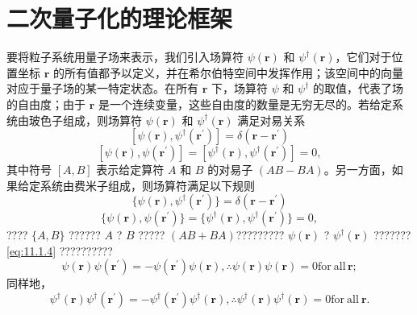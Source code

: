 \section{二次量子化的理论框架}\label{ux4e8cux6b21ux91cfux5b50ux5316ux7684ux7406ux8bbaux6846ux67b6}
要将粒子系统用量子场来表示，我们引入场算符 \(\psi(\boldsymbol{r})\) 和 \(\psi^{\dagger}(\boldsymbol{r})\)，它们对于位置坐标 \(\boldsymbol{r}\) 的所有值都予以定义，并在希尔伯特空间中发挥作用；该空间中的向量对应于量子场的某一特定状态。在所有 \(\boldsymbol{r}\) 下，场算符 \(\psi\) 和 \(\psi^{\dagger}\) 的取值，代表了场的自由度；由于 \(\boldsymbol{r}\) 是一个连续变量，这些自由度的数量是无穷无尽的。若给定系统由玻色子组成，则场算符 \(\psi(\boldsymbol{r})\) 和 \(\psi^{\dagger}(\boldsymbol{r})\) 满足对易关系
\begin{equation}\tag{11.1.1}\label{eq:11.1.1}
[ \psi ( \boldsymbol { r } ) , \psi ^{\dagger} ( \boldsymbol { r } ^{\prime} ) ] = \delta ( \boldsymbol { r } - \boldsymbol { r } ^{\prime} )
\end{equation}
\begin{equation}\tag{11.1.2}\label{eq:11.1.2}
[ \psi ( \pmb { r } ) , \psi ( \pmb { r } ^{\prime} ) ] = [ \psi ^{\dagger} ( \pmb { r } ) , \psi ^{\dagger} ( \pmb { r } ^{\prime} ) ] = 0 ,
\end{equation}
其中符号 \([A,B]\) 表示给定算符 \(A\) 和 \(B\) 的对易子 \((AB-BA)\)。另一方面，如果给定系统由费米子组成，则场算符满足以下规则
\begin{equation}\tag{11.1.3}\label{eq:11.1.3}
\{ \psi ( \pmb { r } ) , \psi ^{\dagger} ( \pmb { r ^{\prime} } ) \} = \delta ( \pmb { r } - \pmb { r ^{\prime} } )
\end{equation}
\begin{equation}\tag{11.1.4}\label{eq:11.1.4}
\{ \psi ( \pmb { r } ) , \psi ( \pmb { r } ^{\prime} ) \} = \{ \psi ^{\dagger} ( \pmb { r } ) , \psi ^{\dagger} ( \pmb { r } ^{\prime} ) \} = 0 ,
\end{equation}
???? \(\{A, B\}\) ?????? \(A\) ? \(B\) ????? \((AB+BA)\)????????? \(\psi(\boldsymbol{r})\) ? \(\psi^\dagger(\boldsymbol{r})\) ??????? \autoref{eq:11.1.4} ??????????
\begin{equation}\tag{11.1.5}\label{eq:11.1.5}
\psi ( \pmb { r } ) \psi ( \pmb { r } ^{\prime} ) = - \psi ( \pmb { r } ^{\prime} ) \psi ( \pmb { r } ) ,  \therefore \psi ( \pmb { r } ) \psi ( \pmb { r } ) = 0  \mathrm { f o r ~ a l l } \, \pmb { r } ;
\end{equation}
同样地，
\begin{equation}\tag{11.1.6}\label{eq:11.1.6}
\psi ^{\dagger} ( \pmb { r } ) \psi ^{\dagger} ( \pmb { r } ^{\prime} ) = - \psi ^{\dagger} ( \pmb { r } ^{\prime} ) \psi ^{\dagger} ( \pmb { r } ) ,  \therefore \psi ^{\dagger} ( \pmb { r } ) \psi ^{\dagger} ( \pmb { r } ) = 0  \mathrm { f o r ~ a l l ~ } \pmb { r } .
\end{equation}
